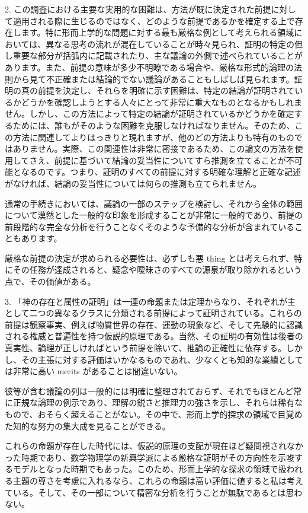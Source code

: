 \documentclass[a4paper,11pt,openany]{ltjsbook}
\begin{document}
2. この調査における主要な実用的な困難は、方法が既に決定された前提に対して適用される際に生じるのではなく、どのような前提であるかを確定する上で存在します。特に形而上学的な問題に対する最も厳格な例として考えられる領域においては、異なる思考の流れが混在していることが時々見られ、証明の特定の但し重要な部分が括弧内に記載されたり、主な議論の外側で述べられていることがあります。また、前提の意味が多少不明瞭である場合や、厳格な形式的論理の法則から見て不正確または結論的でない議論があることもしばしば見られます。証明の真の前提を決定し、それらを明確に示す困難は、特定の結論が証明されているかどうかを確認しようとする人々にとって非常に重大なものとなるかもしれません。しかし、この方法によって特定の結論が証明されているかどうかを確定するためには、誰もがそのような困難を克服しなければなりません。そのため、この方法に関連してよりはっきりと現れますが、他のどの方法よりも特有のものではありません。実際、この関連性は非常に密接であるため、この論文の方法を使用してさえ、前提に基づいて結論の妥当性についてすら推測を立てることが不可能となるのです。つまり、証明のすべての前提に対する明確な理解と正確な記述がなければ、結論の妥当性については何らの推測も立てられません。

通常の手続きにおいては、議論の一部のステップを検討し、それから全体の範囲について漠然とした一般的な印象を形成することが非常に一般的であり、前提の前段階的な完全な分析を行うことなくそのような予備的な分析が含まれていることもあります。

厳格な前提の決定が求められる必要性は、必ずしも悪 thing とは考えられず、特にその任務が達成されると、疑念や曖昧さのすべての源泉が取り除かれるという点で、その価値がある。

3. 「神の存在と属性の証明」は一連の命題または定理からなり、それぞれが主として二つの異なるクラスに分類される前提によって証明されている。これらの前提は観察事実、例えば物質世界の存在、運動の現象など、そして先験的に認識される権威と普遍性を持つ仮説的原理である。当然、その証明の有効性は後者の真実性、論理が正しければという前提を除いて、推論の正確性に依存する。しかし、その主張に対する評価はいかなるものであれ、少なくとも知的な業績としては非常に高い merits があることは間違いない。

彼等が含む議論の列は一般的には明確に整理されておらず、それでもほとんど常に正規な論理の例示であり、理解の鋭さと推理力の強さを示し、それらは稀有なもので、おそらく超えることがない。その中で、形而上学的探求の領域で目覚めた知的な努力の集大成を見ることができる。

これらの命題が存在した時代には、仮説的原理の支配が現在ほど疑問視されなかった時期であり、数学物理学の新興学派による厳格な証明がその方向性を示唆するモデルとなった時期でもあった。このため、形而上学的な探求の領域で扱われる主題の尊さを考慮に入れるなら、これらの命題は高い評価に値すると私は考えている。そして、その一部について精密な分析を行うことが無駄であるとは思わない。
\end{document}
